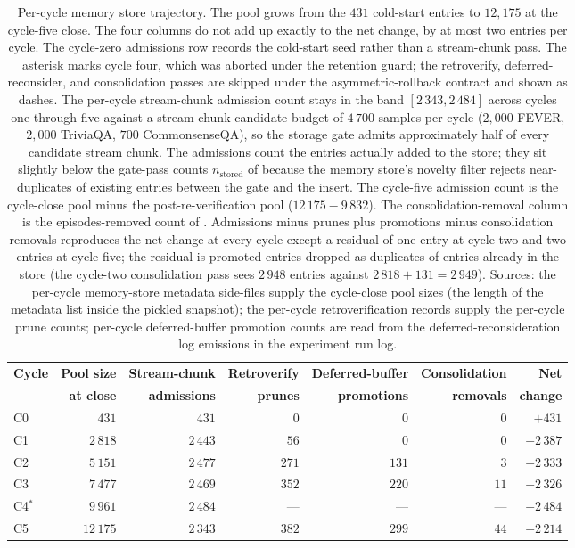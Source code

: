 \begin{table}[!htbp]
\centering\footnotesize
\setlength{\tabcolsep}{3pt}
\renewcommand{\arraystretch}{1.1}
\begin{tabular}{@{}lrrrrrr@{}}
\toprule
\textbf{Cycle} & \textbf{Pool size} & \textbf{Stream-chunk} & \textbf{Retroverify} & \textbf{Deferred-buffer} & \textbf{Consolidation} & \textbf{Net} \\
 & \textbf{at close} & \textbf{admissions} & \textbf{prunes} & \textbf{promotions} & \textbf{removals} & \textbf{change} \\
\midrule
C0 & $431$    & $431$    & $0$ & $0$ & $0$ & $+431$ \\
C1 & $2\,818$ & $2\,443$ & $56$  & $0$   & $0$  & $+2\,387$ \\
C2 & $5\,151$ & $2\,477$ & $271$ & $131$ & $3$  & $+2\,333$ \\
C3 & $7\,477$ & $2\,469$ & $352$ & $220$ & $11$ & $+2\,326$ \\
C4$^{\ast}$ & $9\,961$ & $2\,484$ & ---   & ---   & --- & $+2\,484$ \\
C5 & $12\,175$ & $2\,343$ & $382$ & $299$ & $44$ & $+2\,214$ \\
\bottomrule
\end{tabular}
\caption[Per-cycle memory store trajectory]{Per-cycle memory store trajectory. The pool grows from the $431$ cold-start entries to $12{,}175$ at the cycle-five close. The four columns do not add up exactly to the net change, by at most two entries per cycle. The cycle-zero admissions row records the cold-start seed rather than a stream-chunk pass. The asterisk marks cycle four, which was aborted under the retention guard; the retroverify, deferred-reconsider, and consolidation passes are skipped under the asymmetric-rollback contract and shown as dashes. The per-cycle stream-chunk admission count stays in the band $[2\,343, 2\,484]$ across cycles one through five against a stream-chunk candidate budget of $4\,700$ samples per cycle ($2{,}000$ FEVER, $2{,}000$ TriviaQA, $700$ CommonsenseQA), so the storage gate admits approximately half of every candidate stream chunk. The admissions count the entries actually added to the store; they sit slightly below the gate-pass counts $n_{\text{stored}}$ of  because the memory store's novelty filter rejects near-duplicates of existing entries between the gate and the insert. The cycle-five admission count is the cycle-close pool minus the post-re-verification pool ($12\,175 - 9\,832$). The consolidation-removal column is the episodes-removed count of . Admissions minus prunes plus promotions minus consolidation removals reproduces the net change at every cycle except a residual of one entry at cycle two and two entries at cycle five; the residual is promoted entries dropped as duplicates of entries already in the store (the cycle-two consolidation pass sees $2\,948$ entries against $2\,818 + 131 = 2\,949$). Sources: the per-cycle memory-store metadata side-files supply the cycle-close pool sizes (the length of the metadata list inside the pickled snapshot); the per-cycle retroverification records supply the per-cycle prune counts; per-cycle deferred-buffer promotion counts are read from the deferred-reconsideration log emissions in the experiment run log.}

\end{table}
